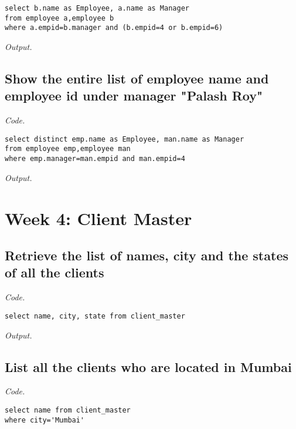 \documentclass[12pt]{article}
\begin{document}
\begin{lstlisting}
select b.name as Employee, a.name as Manager 
from employee a,employee b
where a.empid=b.manager and (b.empid=4 or b.empid=6)
\end{lstlisting}

\textit{Output.}\\

\subsection{Show the entire list of employee name and employee id under manager "Palash Roy"}

\textit{Code.}

\begin{lstlisting}
select distinct emp.name as Employee, man.name as Manager 
from employee emp,employee man
where emp.manager=man.empid and man.empid=4
\end{lstlisting}

\textit{Output.}\\

\section{Week 4: Client Master}

\subsection{Retrieve the list of names, city and the states of all the clients}

\textit{Code.}

\begin{lstlisting}
select name, city, state from client_master
\end{lstlisting}

\textit{Output.}\\

\subsection{List all the clients who are located in Mumbai}

\textit{Code.}

\begin{lstlisting}
select name from client_master
where city='Mumbai'
\end{lstlisting}
\end{document}
